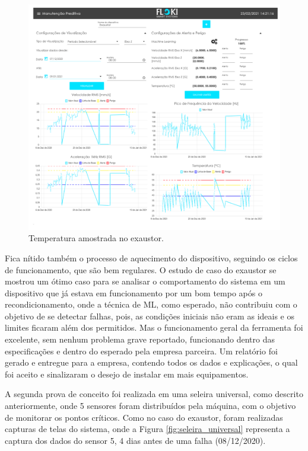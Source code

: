 \begin{figure}[H]
    \caption{Temperatura amostrada no exaustor.}
    \begin{center}
        \includegraphics[scale=0.65, page=3]{resultados/img/resultados.pdf}
    \end{center}
    \label{fig:exaustor_temperatura}
\end{figure}

Fica nítido também o processo de aquecimento do dispositivo, seguindo os ciclos de funcionamento, que são bem regulares. O estudo de caso do 
exaustor se mostrou um ótimo caso para se analisar o comportamento do sistema em um dispositivo que já estava em funcionamento por um bom tempo 
após o recondicionamento, onde a técnica de ML, como esperado, não contribuiu com o objetivo de se detectar falhas, pois, as
condições iniciais não eram as ideais e os limites ficaram além dos permitidos. Mas o funcionamento geral da ferramenta foi excelente, sem nenhum
problema grave reportado, funcionando dentro das especificações e dentro do esperado pela empresa parceira. Um relatório foi gerado e entregue
para a empresa, contendo todos os dados e explicações, o qual foi aceito e sinalizaram o desejo de instalar em mais equipamentos.

A segunda prova de conceito foi realizada em uma seleira universal, como descrito anteriormente, onde 5 sensores foram distribuídos pela máquina, com o 
objetivo de monitorar os pontos críticos. Como no caso do exaustor, foram realizadas capturas de telas do sistema, onde a Figura
\ref{fig:seleira_universal} representa a captura dos dados do sensor 5, 4 dias antes de uma falha (08/12/2020). 

